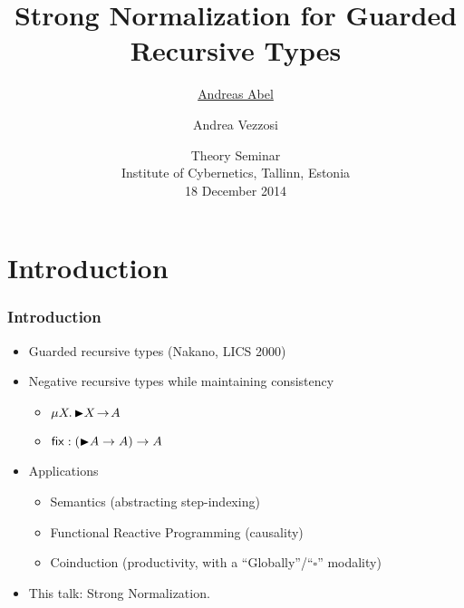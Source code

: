 \documentclass[t]{beamer}
\title[SN Guarded Types]{%
Strong Normalization for Guarded Recursive Types}
\author[Abel Vezzosi]{
  \underline{Andreas Abel}
  \and Andrea Vezzosi
}
\institute[Chalmers/GU] %
{
  Department of Computer Science and Engineering\\
  Chalmers and Gothenburg University, Sweden \\[1ex]
}
\date[IOC 2014] %
{ Theory Seminar \\
  Institute of Cybernetics, Tallinn, Estonia \\
  18 December 2014}
\newcommand{\muT}[2]{\mu {#1} \hspace{-0.1em} . \,  {#2}}
\begin{document}
\newcommand{\lat}[1]{\later \! {#1}}
\newcommand{\arr}{\!\to\!}
\newcommand{\lam}[2]{\lambda {#1} \hspace{-0.1em} . {#2}}
\maketitle



\section{Introduction}


\begin{frame}%
  \frametitle{Introduction}
  \begin{itemize}
  \item Guarded recursive types (Nakano, LICS 2000)
  \item Negative recursive types while maintaining consistency
    \begin{itemize}
      \item $\muT X {\lat X \arr  A}$
      \item $\tfix : (\lat A \to A) \to A$
    \end{itemize}
  \item Applications
    \begin{itemize}
      \item Semantics (abstracting step-indexing)
      \item Functional Reactive Programming (causality)
      \item Coinduction (productivity, with a ``Globally''/``$\square$'' modality)
    \end{itemize}
  \vspace{10pt}
  \item \Large This talk: Strong Normalization.
  \end{itemize}
\end{frame}
\end{document}
